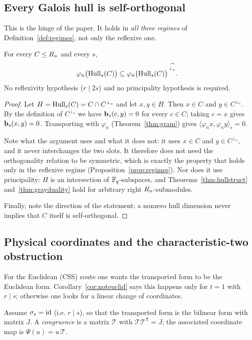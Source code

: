 \subsection{Every Galois hull is self-orthogonal}

This is the hinge of the paper. It holds in \emph{all three regimes} of
Definition~\ref{def:regimes}, not only the reflexive one.

\begin{theorem}\label{thm:hullso}
For every $C\le R_n$ and every $s$,
\[
  \varphi_n\bigl(\operatorname{Hull}_s(C)\bigr)
  \subseteq
  \varphi_n\bigl(\operatorname{Hull}_s(C)\bigr)^{\,{}^{\perp^{\widehat{}}_s}}.
\]
No reflexivity hypothesis ($r\mid 2s$) and no principality hypothesis is
required.
\end{theorem}

\begin{proof}
Let $H=\operatorname{Hull}_s(C)=C\cap C^{\perp_s}$ and let $x,y\in H$. Then $x\in C$ and
$y\in C^{\perp_s}$. By the definition of $C^{\perp_s}$ we have
$\mathbf b_s(c,y)=0$ for every $c\in C$; taking $c=x$ gives $\mathbf b_s(x,y)=0$.
Transporting with $\varphi_n$ (Theorem~\ref{thm:gram}) gives
$\langle\varphi_nx,\varphi_ny\rangle^{\widehat{}}_s=0$.

Note what the argument uses and what it does not: it uses $x\in C$ and
$y\in C^{\perp_s}$, and it never interchanges the two slots. It therefore does
not need the orthogonality relation to be symmetric, which is exactly the
property that holds only in the reflexive regime
(Proposition~\ref{prop:regimes}). Nor does it use principality: $H$ is an
intersection of $\mathbb F_q$-subspaces, and Theorems~\ref{thm:hullstruct}
and~\ref{thm:grayduality} hold for arbitrary right $R_n$-submodules.

Finally, note the direction of the statement: a nonzero hull dimension never
implies that $C$ itself is self-orthogonal.
\end{proof}

\subsection{Physical coordinates and the characteristic-two obstruction}
\label{subsec:phys}

For the Euclidean (CSS) route one wants the transported form to be the Euclidean
form. Corollary~\ref{cor:noteuclid} says this happens only for $t=1$ with
$r\mid s$; otherwise one looks for a linear change of coordinates.

\begin{definition}\label{def:congruence}
Assume $\sigma_s=\mathrm{id}$ (i.e. $r\mid s$), so that the transported form is the
bilinear form with matrix $J$. A \emph{congruence} is a matrix $\mathcal T$
with $\mathcal T\mathcal T^{\mathsf T}=J$; the associated coordinate map is
$\Psi(u)=u\,\mathcal T$.
\end{definition}


